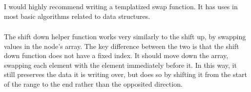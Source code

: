 I would highly recommend writing a templatized swap function. It has uses
in most basic algorithms related to data structures.


\subsubsection{}
\indent The shift down helper function works very similarly to the shift up, by
swapping values in the node's array.
The key difference between the two is that the shift down function does
not have a fixed index. It should move down the array, swapping each
element with the element immediately before it. In this way, it still
preserves the data it is writing over, but does so by shifting it from
the start of the range to the end rather than the opposited direction.
